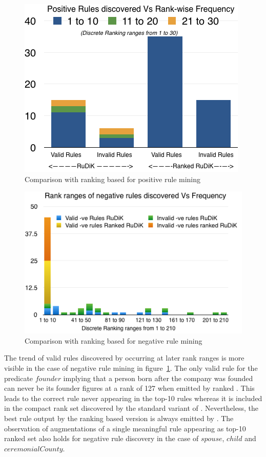 \begin{figure}[htb]
	\centering
	\includegraphics[width=\columnwidth]{include/figure/posRulesRanked.png}
	\caption{Comparison with ranking based \krd for positive rule mining}
	\label{fig:posRulesRanked}
\end{figure}

\begin{figure}[htb]
	\centering
	\includegraphics[width=\columnwidth]{include/figure/negRulesRanked.png}
	\caption{Comparison with ranking based \krd for negative rule mining}
	\label{fig:negRulesRanked}
\end{figure}

The trend of valid rules discovered by \krd occurring at later rank ranges is more visible in the case of negative rule mining in figure~\ref{fig:posRulesRanked}. The only valid rule for the predicate $founder$ implying that a person born after the company was founded can never be its founder figures at a rank of 127 when emitted by ranked \krd. This leads to the correct rule never appearing in the top-10 rules whereas it is included in the compact rank set discovered by the standard variant of \krd. Nevertheless, the best rule output by the ranking based version is always emitted by \krd. The observation of augmentations of a single meaningful rule appearing as top-10 ranked set also holds for negative rule discovery in the case of $spouse$, $child$ and $ceremonialCounty$.